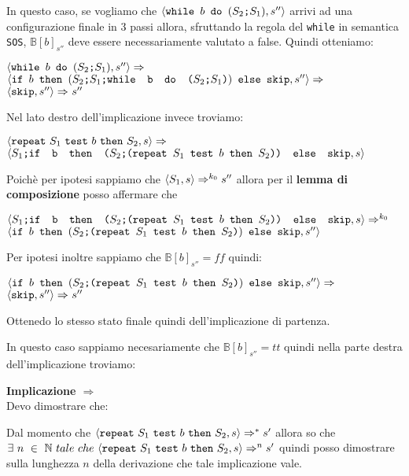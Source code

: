 {	 In questo caso, se vogliamo che 
	$\confSs{\wbS{b}{(\concat{$S_2$}{$S_1$})}}{s''}$ arrivi ad una
	configurazione finale in 3 passi allora, sfruttando la regola del 
	\texttt{while} in semantica \texttt{SOS}, $\mathbb{B}[b]_{s''}$ deve essere
	necessariamente valutato a false. Quindi otteniamo:
	\begin{center}
	$\confSs{\wbS{b}{(\concat{$S_2$}{$S_1$})}}{s''}\Rar{}$\\
	$\confSs{\ifABC{b}{(\concat{\concat{$S_2$}{$S_1$}}
	{\wbS{b}{(\concat{$S_2$}{$S_1$})}})}{\skipistr}}{s''}\Rar{}$\\
	$\confSs{\skipistr}{s''}\Rar{}s''$
	\end{center}
	Nel lato destro dell'implicazione invece troviamo:
	\begin{center}
	$\confSs{\repeatSbS{S_1}{b}{S_2}}{s}\Rar{}$\\
	$\confSs{\concat{$S_1$}{\ifABC{b}{(\concat{$S_2$}
	{(\repeatSbS{$S_1$}{$b$}{$S_2$})})}{\skipistr}}}{s}$
	\end{center}
	Poichè per ipotesi sappiamo che $\confSs{S_1}{s}\Rar{k_0}s''$ allora
	per il \textbf{lemma di composizione} posso affermare che 
	\begin{center}
	$\confSs{\concat{$S_1$}{\ifABC{b}{(\concat{$S_2$}
	{(\repeatSbS{$S_1$}{$b$}{$S_2$})})}{\skipistr}}}{s}\Rar{k_0}$\\
	$\confSs{
		\ifABC{b}{(\concat{$S_2$}{(\repeatSbS{$S_1$}{$b$}{$S_2$})})} 
		{\skipistr}}{s''}$
	\end{center}
	Per ipotesi inoltre sappiamo che $\mathbb{B}[b]_{s''}=ff$ quindi:
	\begin{center}
	$\confSs{
		\ifABC{b}{(\concat{$S_2$}{(\repeatSbS{$S_1$}{$b$}{$S_2$})})} 
		{\skipistr}}{s''}\Rar{}$\\
	$\confSs{\skipistr}{s''}\Rar{}s''$
	\end{center}
	Ottenedo lo stesso stato finale quindi dell'implicazione di partenza.

	 In questo caso sappiamo necesariamente che 
	$\mathbb{B}[b]_{s''}=tt$ quindi nella parte destra dell'implicazione
	troviamo:


	\textbf{Implicazione $\Longrightarrow$}\\
	Devo dimostrare che:
	\begin{center}
	\exThreeLtR{}
	\end{center}
	Dal momento che $\confSs{\repeatSbS{S_1}{b}{S_2}}{s}\Rar{*}s'$ allora so che
	$\exists{}~n~\in~\mathbb{N}~tale~che~
	\confSs{\repeatSbS{S_1}{b}{S_2}}{s}\Rar{n}s'$ quindi posso dimostrare sulla
	lunghezza $n$ della derivazione che tale implicazione vale.

}